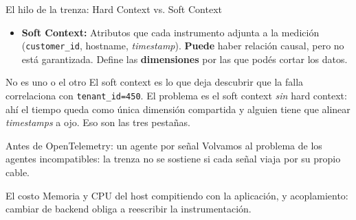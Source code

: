 \documentclass[institutional,screen,none]{../cls/ua-engineering-v6-beamer}
\begin{document}
\begin{frame}{El hilo de la trenza: Hard Context vs. Soft Context}
\begin{itemize}
\item \textbf{Soft Context:} Atributos que cada instrumento adjunta a la medición (\texttt{customer\_id}, hostname, \emph{timestamp}). \textbf{Puede} haber relación causal, pero no está garantizada. Define las \textbf{dimensiones} por las que podés cortar los datos.
\end{itemize}
\pause

\begin{alertblock}{No es uno o el otro}
El soft context es lo que deja descubrir que la falla correlaciona con \texttt{tenant\_id=450}. El problema es el soft context \emph{sin} hard context: ahí el tiempo queda como única dimensión compartida y alguien tiene que alinear \emph{timestamps} a ojo. Eso son las tres pestañas.
\end{alertblock}
\end{frame}

\begin{frame}{Antes de OpenTelemetry: un agente por señal}
Volvamos al problema de los agentes incompatibles: la trenza no se sostiene si cada señal viaja por su propio cable.

\begin{center}
\end{center}

\pause

\begin{alertblock}{El costo}
Memoria y CPU del host compitiendo con la aplicación, y acoplamiento: cambiar de backend obliga a reescribir la instrumentación.
\end{alertblock}
\end{frame}
\end{document}
